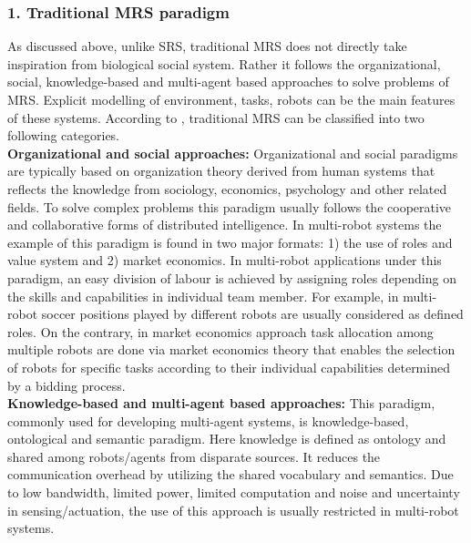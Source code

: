 \subsubsection*{1. Traditional MRS paradigm}
As discussed above, unlike SRS, traditional MRS does not directly  take inspiration from biological social system. Rather it follows the organizational, social, knowledge-based and multi-agent based approaches to solve problems of MRS. Explicit modelling of environment, tasks, robots can be the main features of these systems. According to ,  traditional MRS can be classified into two following categories.\\ 
\textbf{Organizational and social approaches: }
Organizational and social paradigms are typically based on organization theory derived from human systems that reflects the knowledge from sociology, economics, psychology and other related fields. To solve complex problems this paradigm usually follows the cooperative and collaborative forms of distributed intelligence. In multi-robot systems the example of this paradigm is found in two major formats: 1) the use of roles and value system and 2) market economics. In multi-robot applications under this paradigm, an easy division of labour is achieved by assigning roles depending on the skills and capabilities in individual team member. For example, in multi-robot soccer \cite{Stone+1999,Asada+1999} positions played by different robots are usually considered as defined roles. On the contrary, in market economics approach \cite{Gerkey+2002,Dias+2006} task allocation among multiple robots are done via market economics theory that enables the selection of robots for specific tasks according to their individual capabilities determined by a bidding process.\\
\textbf{Knowledge-based and multi-agent based approaches: }
This paradigm, commonly used for developing multi-agent systems, is knowledge-based, ontological and semantic paradigm. Here knowledge is defined as ontology and shared among robots/agents from disparate sources. It reduces the communication overhead by utilizing the shared vocabulary and semantics. Due to low bandwidth, limited power, limited computation and noise and uncertainty in sensing/actuation, the use of this approach is usually restricted in multi-robot systems. \\
